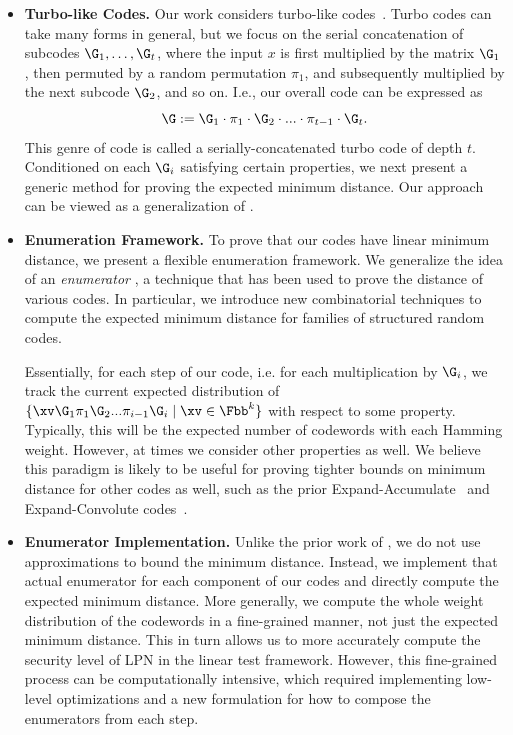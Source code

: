 \begin{itemize}
    \item \textbf{Turbo-like Codes.} Our work considers turbo-like codes~\cite{turbo,spielman}. Turbo codes can take many forms in general, but we focus on the serial concatenation of subcodes $\G_1, \ldots, \G_t$, where the input $x$ is first multiplied by the matrix $\G_1$, then permuted by a random permutation $\pi_1$, and subsequently multiplied by the next subcode $\G_2$, and so on.
    I.e., our overall code can be expressed as 
    $$
    \G := \G_1 \cdot \pi_1 \cdot \G_2 \cdot... \cdot\pi_{t-1} \cdot\G_t.
    $$
    This genre of code is called a serially-concatenated turbo code of depth $t$.
    Conditioned on each $\G_i$ satisfying certain properties, we next present a generic method for proving the expected minimum distance. Our approach can be viewed as a generalization of \cite{spielman}.

    \item \textbf{Enumeration Framework.} To prove that our codes have linear minimum distance, we present a flexible enumeration framework. We generalize the idea of an \emph{enumerator}  \cite{kahale1998minimum,spielman}, a technique that has been used to prove the distance of various codes. In particular, we introduce new combinatorial techniques to compute the expected minimum distance for families of structured random codes. 

    \medskip

    Essentially, for each step of our code, i.e. for each multiplication by $\G_i$, we track the current expected distribution of $\{\xv \G_1\pi_1\G_2...\pi_{i-1}\G_i \mid  \xv\in \Fbb^k\}$ with respect to some property. Typically, this will be the expected number of codewords with each Hamming weight. However, at times we consider other properties as well. We believe this paradigm is likely to be useful for proving tighter bounds on minimum distance for other codes as well, such as the prior Expand-Accumulate~\cite{EA} and Expand-Convolute codes~\cite{EC}.


    \item \textbf{Enumerator Implementation.} Unlike the prior work of \cite{spielman}, we do not use approximations to bound the minimum distance. Instead, we implement that actual enumerator for each component of our codes and directly compute the expected minimum distance. More generally, we compute the whole weight distribution of the codewords in a fine-grained manner, not just the expected minimum distance. This in turn allows us to more accurately compute the security level of LPN in the linear test framework. However, this fine-grained process can be computationally intensive, which required implementing low-level optimizations and a new formulation for how to compose the enumerators from each step.


\end{itemize}
